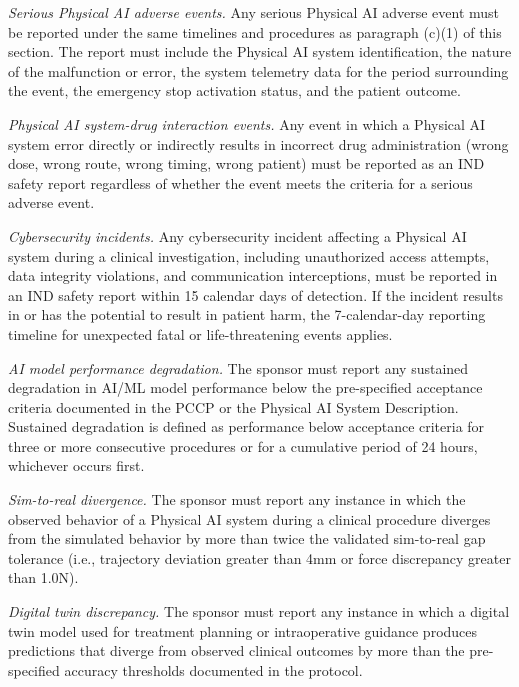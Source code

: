 \documentclass[11pt]{article}
\begin{document}
\begin{description}[leftmargin=0.8cm,style=sameline]
\item[(i)] \textit{Serious Physical AI adverse events.} Any serious Physical AI adverse event must be reported under the same timelines and procedures as paragraph (c)(1) of this section. The report must include the Physical AI system identification, the nature of the malfunction or error, the system telemetry data for the period surrounding the event, the emergency stop activation status, and the patient outcome.
\item[(ii)] \textit{Physical AI system-drug interaction events.} Any event in which a Physical AI system error directly or indirectly results in incorrect drug administration (wrong dose, wrong route, wrong timing, wrong patient) must be reported as an IND safety report regardless of whether the event meets the criteria for a serious adverse event.
\item[(iii)] \textit{Cybersecurity incidents.} Any cybersecurity incident affecting a Physical AI system during a clinical investigation, including unauthorized access attempts, data integrity violations, and communication interceptions, must be reported in an IND safety report within 15 calendar days of detection. If the incident results in or has the potential to result in patient harm, the 7-calendar-day reporting timeline for unexpected fatal or life-threatening events applies.
\item[(iv)] \textit{AI model performance degradation.} The sponsor must report any sustained degradation in AI/ML model performance below the pre-specified acceptance criteria documented in the PCCP or the Physical AI System Description. Sustained degradation is defined as performance below acceptance criteria for three or more consecutive procedures or for a cumulative period of 24 hours, whichever occurs first.
\item[(v)] \textit{Sim-to-real divergence.} The sponsor must report any instance in which the observed behavior of a Physical AI system during a clinical procedure diverges from the simulated behavior by more than twice the validated sim-to-real gap tolerance (i.e., trajectory deviation greater than 4mm or force discrepancy greater than 1.0N).
\item[(vi)] \textit{Digital twin discrepancy.} The sponsor must report any instance in which a digital twin model used for treatment planning or intraoperative guidance produces predictions that diverge from observed clinical outcomes by more than the pre-specified accuracy thresholds documented in the protocol.
\end{description}
\end{document}
